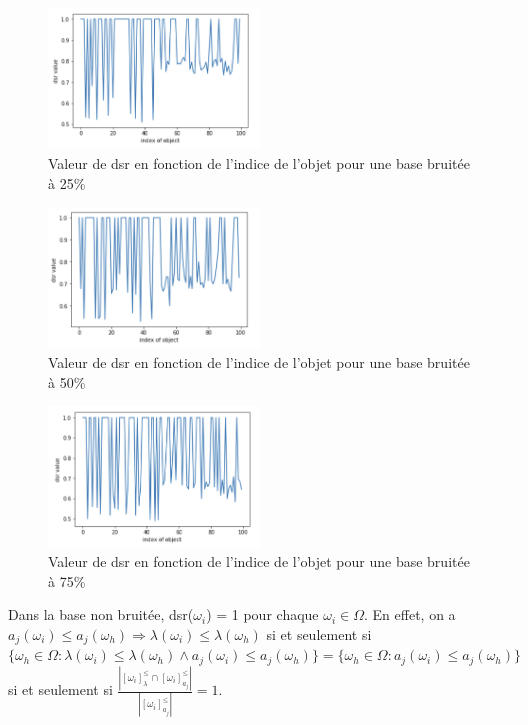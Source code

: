 \documentclass[a4paper]{article}
\begin{document}
\begin{figure}[H]
	\center 
	\includegraphics[width=0.5\textwidth]{images/dsr_25.png}
    \caption{Valeur de dsr en fonction de l'indice de l'objet pour une base
    bruitée à 25\%}
    \label{img:dsr25}
\end{figure}

\begin{figure}[H]
	\center 
	\includegraphics[width=0.5\textwidth]{images/dsr_50.png}
    \caption{Valeur de dsr en fonction de l'indice de l'objet pour une base
    bruitée à 50\%}
    \label{img:dsr50}
\end{figure}

\begin{figure}[H]
	\center 
	\includegraphics[width=0.5\textwidth]{images/dsr_75.png}
    \caption{Valeur de dsr en fonction de l'indice de l'objet pour une base
    bruitée à 75\%}
    \label{img:dsr75}
\end{figure}


Dans la base non bruitée, dsr($\omega_i$) = 1 pour chaque $\omega_i \in \Omega$.
En effet, on a $a_j(\omega_i) \leq a_j(\omega_h) \Rightarrow \lambda(\omega_i)
\leq \lambda(\omega_h)$ si et seulement si $\{\omega_h \in \Omega :
\lambda(\omega_i) \leq \lambda(\omega_h) \land a_j(\omega_i) \leq
a_j(\omega_h)\} = \{\omega_h \in \Omega : a_j(\omega_i) \leq a_j(\omega_h)\}$ si
et seulement si $\frac{| [\omega_i]^{\leq}_{\lambda} \cap
[\omega_i]^{\leq}_{a_j}|}{| [\omega_i]^{\leq}_{a_j} |} = 1 $.
\end{document}
